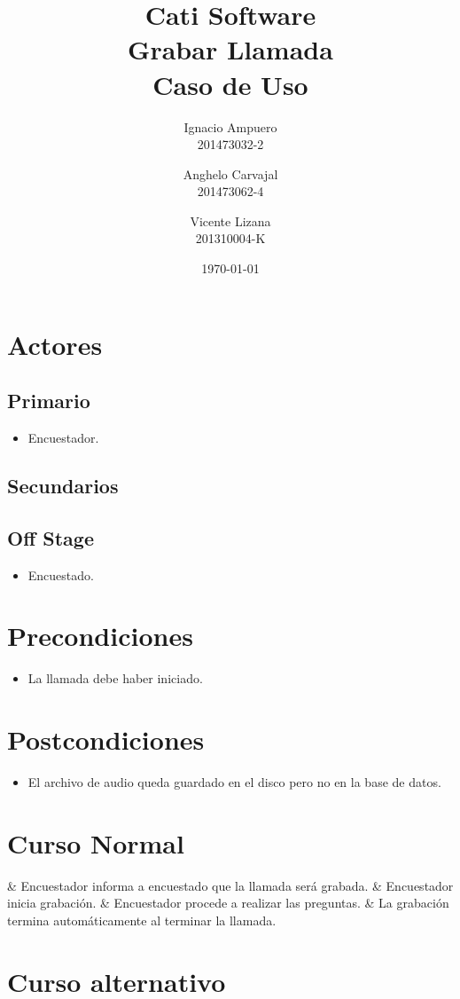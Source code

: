 \documentclass[fleqn]{article}
\title{\huge Cati Software\\ \Huge Grabar Llamada\\ \Large Caso de Uso \vspace{30pt}}
\author{Ignacio Ampuero\\ 201473032-2 \and Anghelo Carvajal\\ 201473062-4 \and Vicente Lizana\\ 201310004-K}
\date{\today}
\begin{document}
\maketitle
\vspace{30pt}

\section{Actores}

	\subsection{Primario}
	
	\begin{itemize}
		\item Encuestador.
	\end{itemize}
	
	\subsection{Secundarios}
	
	\subsection{Off Stage}
	
	\begin{itemize}
		\item Encuestado.
	\end{itemize}

\section{Precondiciones}

\begin{itemize}
	\item La llamada debe haber iniciado.
\end{itemize}

\section{Postcondiciones}

\begin{itemize}
	\item El archivo de audio queda guardado en el disco pero no en la base de datos.
\end{itemize}

\section{Curso Normal}

\begin{easylist}
	& Encuestador informa a encuestado que la llamada será grabada.
	& Encuestador inicia grabación.
	& Encuestador procede a realizar las preguntas.
	& La grabación termina automáticamente al terminar la llamada.
\end{easylist}

\section{Curso alternativo}
\end{document}
